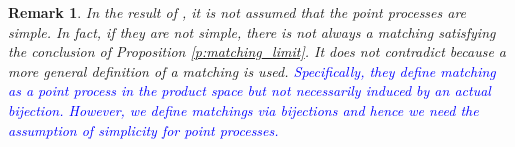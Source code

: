 \documentclass[12pt]{article}
\newtheorem{remark}{Remark}
\newcommand{\1}{\mathbf{1}}
\newcommand{\tmu}{\tilde{\mu}}
\newcommand{\dy}[1]{\textcolor{blue}{#1}}
\newcommand{\dy}[1]{#1}%
\renewcommand{\footnote}[1]{}
\begin{document}
{{{{{\begin{remark}
In the result of  \cite{erbar2023optimal}, it is not assumed that the point processes are simple. In fact, if they are not simple, there is not always a matching satisfying the conclusion of Proposition \ref{p:matching_limit}. It does not contradict \cite[Proposition 2.11]{erbar2023optimal} because a more general definition of a matching is used. \dy{Specifically, they define matching as a point process in the product space but not necessarily induced by an actual bijection. However, we define matchings via bijections and hence we need the assumption of simplicity for point processes.}
\end{remark}

%




}}}}}
\end{document}
